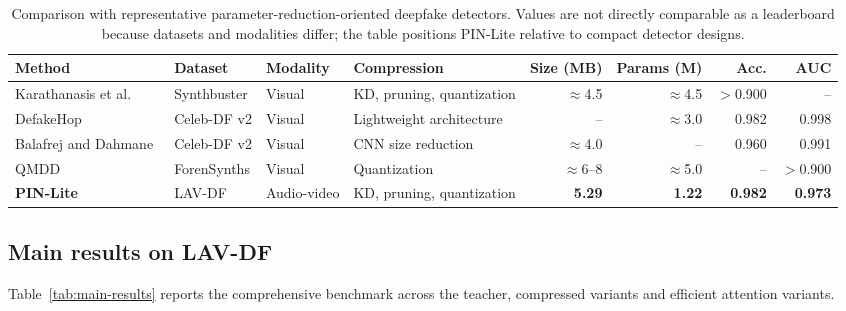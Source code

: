 \documentclass[pdflatex,sn-basic,Numbered]{sn-jnl}
\begin{document}
\begin{table}[t]
\caption{Comparison with representative parameter-reduction-oriented deepfake detectors. Values are not directly comparable as a leaderboard because datasets and modalities differ; the table positions PIN-Lite relative to compact detector designs.}\label{tab:baseline-comparison}
\centering
\tiny
\setlength{\tabcolsep}{2pt}
\begin{tabular}{p{}p{}p{}p{}rrrr}
\toprule
Method & Dataset & Modality & Compression & Size (MB) & Params (M) & Acc. & AUC \\
\midrule
Karathanasis et al.~\cite{karathanasis2025compression} & Synthbuster & Visual & KD, pruning, quantization & $\approx$4.5 & $\approx$4.5 & $>$0.900 & -- \\
DefakeHop~\cite{chen2021defakehop} & Celeb-DF v2 & Visual & Lightweight architecture & -- & $\approx$3.0 & 0.982 & 0.998 \\
Balafrej and Dahmane~\cite{balafrej2024lightweight} & Celeb-DF v2 & Visual & CNN size reduction & $\approx$4.0 & -- & 0.960 & 0.991 \\
QMDD~\cite{cheng2024multiscale} & ForenSynths & Visual & Quantization & $\approx$6--8 & $\approx$5.0 & -- & $>$0.900 \\
\textbf{PIN-Lite} & LAV-DF & Audio-video & KD, pruning, quantization & \textbf{5.29} & \textbf{1.22} & \textbf{0.982} & \textbf{0.973} \\
\bottomrule
\end{tabular}
\end{table}

\subsection{Main results on LAV-DF}\label{subsec:main-results}

Table~\ref{tab:main-results} reports the comprehensive benchmark across the teacher, compressed variants and efficient attention variants.
\end{document}
